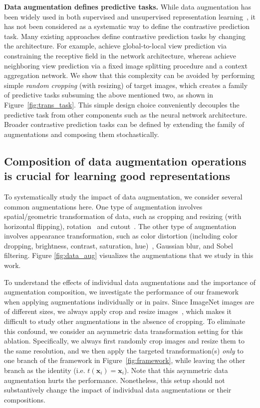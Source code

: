 \textbf{Data augmentation defines predictive tasks.} While data augmentation has been widely used in both supervised and unsupervised representation learning~\cite{krizhevsky2012imagenet,henaff2019data,bachman2019learning}, it has not been considered as a systematic way to define the contrastive prediction task. Many existing approaches define contrastive prediction tasks by changing the architecture. For example, \citet{hjelm2018learning,bachman2019learning} achieve global-to-local view prediction via constraining the receptive field in the network architecture, whereas \citet{oord2018representation,henaff2019data} achieve neighboring view prediction via a fixed image splitting procedure and a context aggregation network. We show that this complexity can be avoided by performing simple \textit{random cropping} (with resizing) of target images, which creates a family of predictive tasks subsuming the above mentioned two, as shown in Figure~\ref{fig:trans_task}. This simple design choice conveniently decouples the predictive task from other components such as the neural network architecture. Broader contrastive prediction tasks can be defined by extending the family of augmentations and composing them stochastically.

\subsection{Composition of data augmentation operations is crucial for learning good representations}

To systematically study the impact of data augmentation, we consider several common augmentations here. One type of augmentation involves spatial/geometric transformation of data, such as cropping and resizing (with horizontal flipping), rotation~\cite{gidaris2018unsupervised} and cutout~\cite{devries2017improved}. The other type of augmentation involves appearance transformation, such as color distortion (including color dropping, brightness, contrast, saturation, hue)~\cite{howard2013some,szegedy2015going}, Gaussian blur, and Sobel filtering. Figure \ref{fig:data_aug} visualizes the augmentations that we study in this work.

To understand the effects of individual data augmentations and the importance of augmentation composition, we investigate the performance of our framework when applying augmentations individually or in pairs. Since ImageNet images are of different sizes, we always apply crop and resize images~\cite{krizhevsky2012imagenet,szegedy2015going}, which makes it difficult to study other augmentations in the absence of cropping. To eliminate this confound, we consider an asymmetric data transformation setting for this ablation. Specifically, we always first randomly crop images and resize them to the same resolution, and we then apply the targeted transformation(s) \textit{only} to one branch of the framework in Figure~\ref{fig:framework}, while leaving the other branch as the identity (i.e. $t(\bm x_i) = \bm x_i$). Note that this asymmetric data augmentation hurts the performance. Nonetheless, this setup should not substantively change the impact of individual data augmentations or their compositions.

